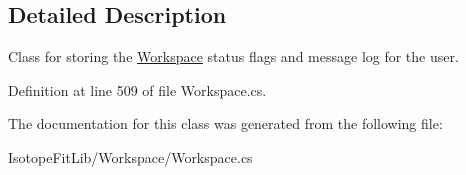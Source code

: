 \subsection{Detailed Description}
Class for storing the \mbox{\hyperlink{class_isotope_fit_1_1_workspace}{Workspace}} status flags and message log for the user. 



Definition at line 509 of file Workspace.\+cs.



The documentation for this class was generated from the following file\+:\begin{DoxyCompactItemize}
\item 
Isotope\+Fit\+Lib/\+Workspace/Workspace.\+cs\end{DoxyCompactItemize}
